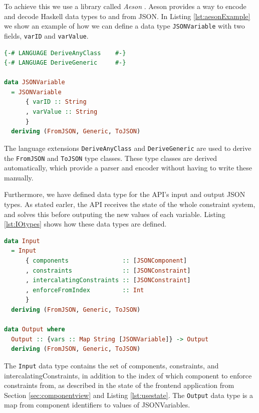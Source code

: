 \documentclass[11pt, a4paper]{article}
\begin{document}
To achieve this we use a library called \textit{Aeson} \cite{aeson}. Aeson provides a way to encode and decode Haskell data types to and from JSON. In Listing \ref{lst:aesonExample} we show an example of how we can define a data type \texttt{JSONVariable} with two fields, \texttt{varID} and \texttt{varValue}.

\begin{lstlisting}[float, language=haskell, caption={Example of a data type for a JSON-variable.}, label={lst:aesonExample}]
{-# LANGUAGE DeriveAnyClass    #-}
{-# LANGUAGE DeriveGeneric     #-}

data JSONVariable
  = JSONVariable
      { varID :: String
      , varValue :: String
      }
  deriving (FromJSON, Generic, ToJSON)
\end{lstlisting}

The language extensions \texttt{DeriveAnyClass} and \texttt{DeriveGeneric} are used to derive the \texttt{FromJSON} and \texttt{ToJSON} type classes. These type classes are derived automatically, which provide a parser and encoder without having to write these manually.

Furthermore, we have defined data type for the API's input and output JSON types. As stated earler, the API receives the state of the whole constraint system, and solves this before outputing the new values of each variable. Listing \ref{lst:IOtypes} shows how these data types are defined.

\begin{lstlisting}[language=haskell, caption={Input and output data types for the API.}, label={lst:IOtypes}]
data Input
  = Input
      { components               :: [JSONComponent]
      , constraints              :: [JSONConstraint]
      , intercalatingConstraints :: [JSONConstraint]
      , enforceFromIndex         :: Int
      }
  deriving (FromJSON, Generic, ToJSON)

data Output where
  Output :: {vars :: Map String [JSONVariable]} -> Output
  deriving (FromJSON, Generic, ToJSON)
\end{lstlisting}

The \texttt{Input} data type contains the set of components, constraints, and intercalatingConstraints, in addition to the index of which component to enforce constraints from, as described in the state of the frontend application from Section \ref{sec:componentview} and Listing \ref{lst:usestate}. The \texttt{Output} data type is a map from component identifiers to values of JSONVariables.
\end{document}
